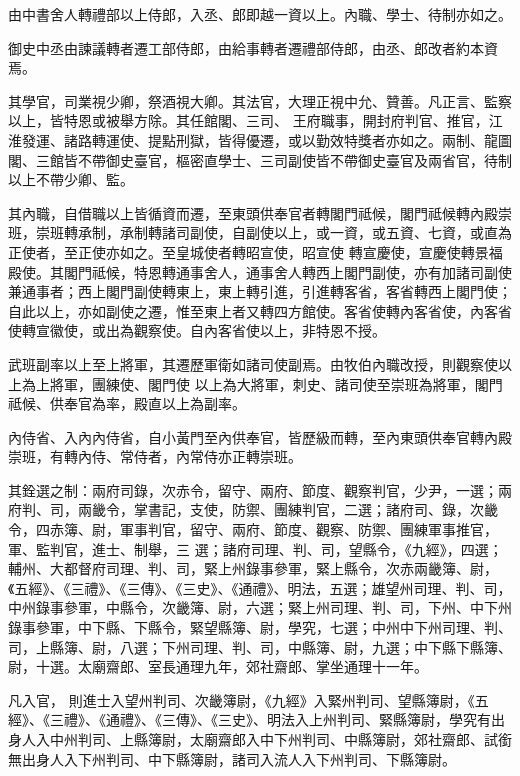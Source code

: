 \begin{pinyinscope}
 由中書舍人轉禮部以上侍郎，入丞、郎即越一資以上。內職、學士、待制亦如之。



 御史中丞由諫議轉者遷工部侍郎，由給事轉者遷禮部侍郎，由丞、郎改者約本資焉。



 其學官，司業視少卿，祭酒視大卿。其法官，大理正視中允、贊善。凡正言、監察以上，皆特恩或被舉方除。其任館閣、三司、
 王府職事，開封府判官、推官，江淮發運、諸路轉運使、提點刑獄，皆得優遷，或以勤效特獎者亦如之。兩制、龍圖閣、三館皆不帶御史臺官，樞密直學士、三司副使皆不帶御史臺官及兩省官，待制以上不帶少卿、監。



 其內職，自借職以上皆循資而遷，至東頭供奉官者轉閣門祗候，閣門祗候轉內殿崇班，崇班轉承制，承制轉諸司副使，自副使以上，或一資，或五資、七資，或直為正使者，至正使亦如之。至皇城使者轉昭宣使，昭宣使
 轉宣慶使，宣慶使轉景福殿使。其閣門祗候，特恩轉通事舍人，通事舍人轉西上閣門副使，亦有加諸司副使兼通事者；西上閣門副使轉東上，東上轉引進，引進轉客省，客省轉西上閣門使；自此以上，亦如副使之遷，惟至東上者又轉四方館使。客省使轉內客省使，內客省使轉宣徽使，或出為觀察使。自內客省使以上，非特恩不授。



 武班副率以上至上將軍，其遷歷軍衛如諸司使副焉。由牧伯內職改授，則觀察使以上為上將軍，團練使、閣門使
 以上為大將軍，刺史、諸司使至崇班為將軍，閣門祗候、供奉官為率，殿直以上為副率。



 內侍省、入內內侍省，自小黃門至內供奉官，皆歷級而轉，至內東頭供奉官轉內殿崇班，有轉內侍、常侍者，內常侍亦正轉崇班。



 其銓選之制：兩府司錄，次赤令，留守、兩府、節度、觀察判官，少尹，一選；兩府判、司，兩畿令，掌書記，支使，防禦、團練判官，二選；諸府司、錄，次畿令，四赤簿、尉，軍事判官，留守、兩府、節度、觀察、防禦、團練軍事推官，軍、監判官，進士、制舉，三
 選；諸府司理、判、司，望縣令，《九經》，四選；輔州、大都督府司理、判、司，緊上州錄事參軍，緊上縣令，次赤兩畿簿、尉，《五經》、《三禮》、《三傳》、《三史》、《通禮》、明法，五選；雄望州司理、判、司，中州錄事參軍，中縣令，次畿簿、尉，六選；緊上州司理、判、司，下州、中下州錄事參軍，中下縣、下縣令，緊望縣簿、尉，學究，七選；中州中下州司理、判、司，上縣簿、尉，八選；下州司理、判、司，中縣簿、尉，九選；中下縣下縣簿、尉，十選。太廟齋郎、室長通理九年，郊社齋郎、掌坐通理十一年。



 凡入官，
 則進士入望州判司、次畿簿尉，《九經》入緊州判司、望縣簿尉，《五經》、《三禮》、《通禮》、《三傳》、《三史》、明法入上州判司、緊縣簿尉，學究有出身人入中州判司、上縣簿尉，太廟齋郎入中下州判司、中縣簿尉，郊社齋郎、試銜無出身人入下州判司、中下縣簿尉，諸司入流人入下州判司、下縣簿尉。




\end{pinyinscope}
